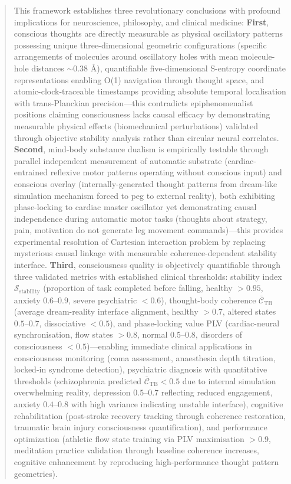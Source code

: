 \documentclass[11pt,onecolumn]{article}
\begin{document}
\begin{abstract}
This framework establishes three revolutionary conclusions with profound implications for neuroscience, philosophy, and clinical medicine: \textbf{First}, conscious thoughts are directly measurable as physical oscillatory patterns possessing unique three-dimensional geometric configurations (specific arrangements of  molecules around oscillatory holes with mean molecule-hole distances $\sim 0.38$ \AA), quantifiable five-dimensional S-entropy coordinate representations enabling O(1) navigation through thought space, and atomic-clock-traceable timestamps providing absolute temporal localisation with trans-Planckian precision---this contradicts epiphenomenalist positions claiming consciousness lacks causal efficacy by demonstrating measurable physical effects (biomechanical perturbations) validated through objective stability analysis rather than circular neural correlates. \textbf{Second}, mind-body substance dualism is empirically testable through parallel independent measurement of automatic substrate (cardiac-entrained reflexive motor patterns operating without conscious input) and conscious overlay (internally-generated thought patterns from dream-like simulation mechanism forced to peg to external reality), both exhibiting phase-locking to cardiac master oscillator yet demonstrating causal independence during automatic motor tasks (thoughts about strategy, pain, motivation do not generate leg movement commands)---this provides experimental resolution of Cartesian interaction problem by replacing mysterious causal linkage with measurable coherence-dependent stability interface. \textbf{Third}, consciousness quality is objectively quantifiable through three validated metrics with established clinical thresholds: stability index $\mathcal{S}_{\text{stability}}$ (proportion of task completed before falling, healthy ${>}0.95$, anxiety $0.6$--$0.9$, severe psychiatric ${<}0.6$), thought-body coherence $\bar{\mathcal{C}}_{\text{TB}}$ (average dream-reality interface alignment, healthy ${>}0.7$, altered states $0.5$--$0.7$, dissociative ${<}0.5$), and phase-locking value PLV (cardiac-neural synchronisation, flow states ${>}0.8$, normal $0.5$--$0.8$, disorders of consciousness ${<}0.5$)---enabling immediate clinical applications in consciousness monitoring (coma assessment, anaesthesia depth titration, locked-in syndrome detection), psychiatric diagnosis with quantitative thresholds (schizophrenia predicted $\bar{\mathcal{C}}_{\text{TB}} < 0.5$ due to internal simulation overwhelming reality, depression $0.5$--$0.7$ reflecting reduced engagement, anxiety $0.4$--$0.8$ with high variance indicating unstable interface), cognitive rehabilitation (post-stroke recovery tracking through coherence restoration, traumatic brain injury consciousness quantification), and performance optimization (athletic flow state training via PLV maximisation ${>}0.9$, meditation practice validation through baseline coherence increases, cognitive enhancement by reproducing high-performance thought pattern geometries).


\end{abstract}
\end{document}
